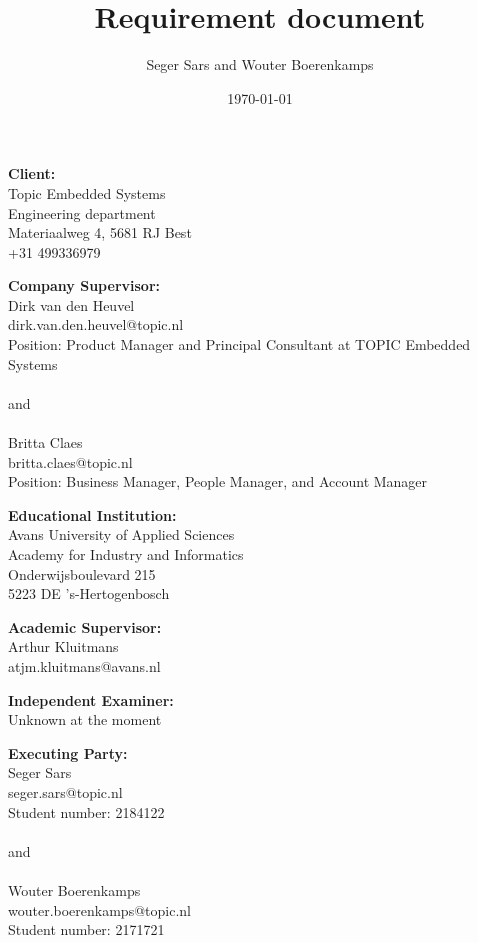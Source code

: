 \documentclass{article}
\title{Requirement document}
\author{Seger Sars and Wouter Boerenkamps}
\date{\today}
\begin{document}
\maketitle

\newpage

\noindent \textbf{Client:}\\
Topic Embedded Systems\\
Engineering department\\
Materiaalweg 4, 5681 RJ Best\\
+31 499336979\\

\vspace{1em}

\noindent \textbf{Company Supervisor:}\\
Dirk van den Heuvel\\
dirk.van.den.heuvel@topic.nl\\
Position: Product Manager and Principal Consultant at TOPIC Embedded Systems\\
\\
and\\
\\
Britta Claes\\
britta.claes@topic.nl\\
Position: Business Manager, People Manager, and Account Manager

\vspace{1em}

\noindent \textbf{Educational Institution:}\\
Avans University of Applied Sciences\\
Academy for Industry and Informatics\\
Onderwijsboulevard 215\\
5223 DE 's-Hertogenbosch

\vspace{1em}

\noindent \textbf{Academic Supervisor:}\\
Arthur Kluitmans\\
atjm.kluitmans@avans.nl

\vspace{1em}

\noindent \textbf{Independent Examiner:}\\
Unknown at the moment

\vspace{1em}

\noindent \textbf{Executing Party:}\\
Seger Sars\\
seger.sars@topic.nl\\
Student number: 2184122\\
\\
and\\
\\
Wouter Boerenkamps\\
wouter.boerenkamps@topic.nl\\
Student number: 2171721
\end{document}
